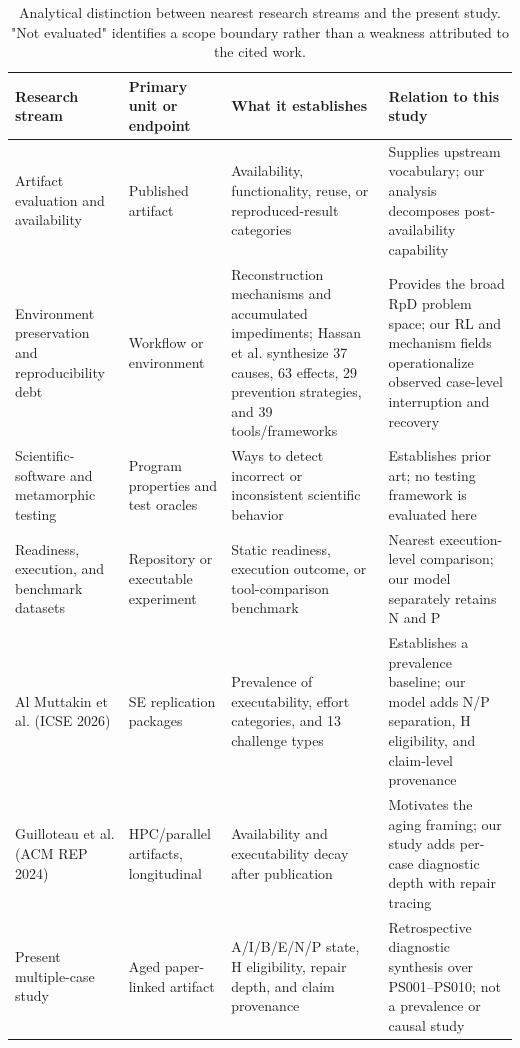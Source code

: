 \documentclass[a4paper,fleqn]{cas-dc}
\begin{document}
\begin{table}[t]
\centering
\caption{Analytical distinction between nearest research streams and the present study. "Not evaluated" identifies a scope boundary rather than a weakness attributed to the cited work.}
\label{tab:1}
\footnotesize
\setlength{\tabcolsep}{3pt}
\begin{tabularx}{\textwidth}{@{}>{\raggedright\arraybackslash}X>{\raggedright\arraybackslash}X>{\raggedright\arraybackslash}X>{\raggedright\arraybackslash}X@{}}
\toprule
Research stream & Primary unit or endpoint & What it establishes & Relation to this study \\
\midrule
Artifact evaluation and availability & Published artifact & Availability, functionality, reuse, or reproduced-result categories & Supplies upstream vocabulary; our analysis decomposes post-availability capability \\
Environment preservation and reproducibility debt & Workflow or environment & Reconstruction mechanisms and accumulated impediments; Hassan et al. synthesize 37 causes, 63 effects, 29 prevention strategies, and 39 tools/frameworks & Provides the broad RpD problem space; our RL and mechanism fields operationalize observed case-level interruption and recovery \\
Scientific-software and metamorphic testing & Program properties and test oracles & Ways to detect incorrect or inconsistent scientific behavior & Establishes prior art; no testing framework is evaluated here \\
Readiness, execution, and benchmark datasets & Repository or executable experiment & Static readiness, execution outcome, or tool-comparison benchmark & Nearest execution-level comparison; our model separately retains N and P \\
Al Muttakin et al. (ICSE 2026) & 100 SE replication packages & Prevalence of executability, effort categories, and 13 challenge types & Establishes a prevalence baseline; our model adds N/P separation, H eligibility, and claim-level provenance \\
Guilloteau et al. (ACM REP 2024) & HPC/parallel artifacts, longitudinal & Availability and executability decay after publication & Motivates the aging framing; our study adds per-case diagnostic depth with repair tracing \\
Present multiple-case study & Aged paper-linked artifact & A/I/B/E/N/P state, H eligibility, repair depth, and claim provenance & Retrospective diagnostic synthesis over PS001--PS010; not a prevalence or causal study \\
\bottomrule
\end{tabularx}
\end{table}
\end{document}
